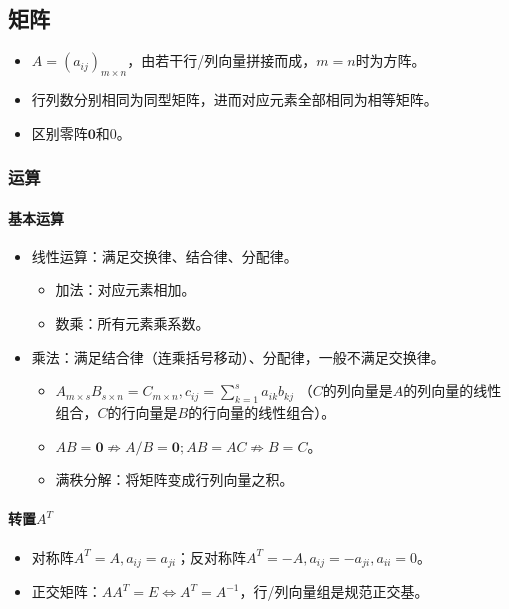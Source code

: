 \documentclass[
12pt, %
a4paper, 
oneside, %
headinclude,footinclude, %
]{scrartcl}
\begin{document}
\subsection[矩阵]{矩阵}
\begin{itemize}
\item $ A = (a_{ij})_{m \times n} $，由若干行/列向量拼接而成，$ m = n $时为方阵。
\item 行列数分别相同为同型矩阵，进而对应元素全部相同为相等矩阵。
\item 区别零阵$ \mathbf{0} $和$ 0 $。
\end{itemize}
\subsubsection[运算]{运算}
\paragraph{基本运算}
\begin{itemize}
\item 线性运算：满足交换律、结合律、分配律。
\begin{itemize}
\item 加法：对应元素相加。
\item 数乘：所有元素乘系数。
\end{itemize}
\item 乘法：满足结合律（连乘括号移动）、分配律，一般不满足交换律。
\begin{itemize}
\item $ A_{m \times s}B_{s \times n} = C_{m \times n}, c_{ij} = \sum_{k = 1}^s a_{ik}b_{kj} $
（$ C $的列向量是$ A $的列向量的线性组合，$ C $的行向量是$ B $的行向量的线性组合）。
\item $ AB = \mathbf{0} \nRightarrow A/B = \mathbf{0}; AB = AC \nRightarrow B = C $。
\item 满秩分解：将矩阵变成行列向量之积。
\end{itemize}
\end{itemize}
\paragraph{转置$ A^T $}
\begin{itemize}
\item 对称阵$ A^T = A, a_{ij} = a_{ji} $；反对称阵$ A^T = -A, a_{ij} = -a_{ji}, a_{ii} = 0 $。
\item 正交矩阵：$ AA^T = E \Leftrightarrow A^T = A^{-1} $，行/列向量组是规范正交基。
\end{itemize}
\end{document}
